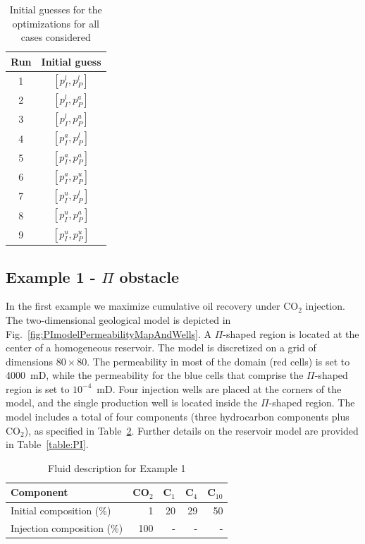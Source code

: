 \documentclass[twocolumn,numbook]{svjour3}          %
\begin{document}
\begin{table}
\centering
\caption{Initial guesses for the optimizations for all
         cases considered}
\begin{tabular}{|c|c|}
\hline
Run & Initial guess    \\
\hline
1 & $[p_I^l, p_P^l]$ \\
2 & $[p_I^l, p_P^a]$ \\
3 & $[p_I^l, p_P^u]$ \\
4 & $[p_I^a, p_P^l]$ \\
5 & $[p_I^a, p_P^a]$ \\
6 & $[p_I^a, p_P^u]$ \\
7 & $[p_I^u, p_P^l]$ \\
8 & $[p_I^u, p_P^a]$ \\
9 & $[p_I^u, p_P^u]$ \\
\hline
\end{tabular}
  \label{table:InitialGuesses}
\end{table}





\subsection{Example 1 - $\Pi$ obstacle}

In the first example we maximize cumulative oil recovery under CO$_2$ injection. The two-dimensional geological model is depicted in Fig.~\ref{fig:PImodelPermeabilityMapAndWells}. A $\Pi$-shaped region is located at the center of a homogeneous reservoir. The model is discretized on a grid of dimensions $80\times80$. The permeability in most of the domain (red cells) is set to 4000~mD, while the permeability for the blue cells that comprise the $\Pi$-shaped region is set to $10^{-4}$~mD. Four injection wells are placed at the corners of the model, and the single production well is located inside the $\Pi$-shaped region. The model includes a total of four components (three hydrocarbon  components plus CO$_2$), as specified in Table~\ref{table:fluidForPImodel}. Further details on the reservoir model are provided in Table~\ref{table:PI}.

%
\begin{table}
\centering
\caption{Fluid description for Example 1}
\begin{tabular}{|l|r|r|r|r|}
\hline
Component            & CO$_2$ & C$_1$ & C$_4$ & C$_{10}$    \\
\hline
Initial composition (\%)  & 1    & 20  & 29    & 50 \\
Injection composition (\%)& 100   & - & - & - \\
\hline
\end{tabular}
\label{table:fluidForPImodel}
\end{table}
%
\end{document}
